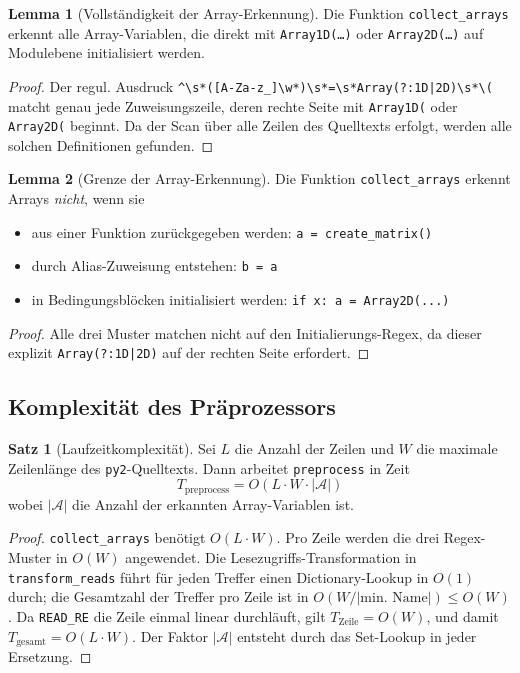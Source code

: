 ﻿\documentclass[a4paper,12pt]{article}
\theoremstyle{definition}
\newtheorem{satz}{Satz}
\newtheorem{lemma}{Lemma}
\begin{document}
\begin{lemma}[Vollst\"andigkeit der Array-Erkennung]
	Die Funktion \texttt{collect\_arrays} erkennt alle Array-Variablen, die direkt
	mit \texttt{Array1D(\ldots)} oder \texttt{Array2D(\ldots)} auf Modulebene
	initialisiert werden.
\end{lemma}

\begin{proof}
	Der regul. Ausdruck \texttt{\^{}\textbackslash{}s*([A-Za-z\_]\textbackslash{}w*)\textbackslash{}s*=\textbackslash{}s*Array(?:1D|2D)\textbackslash{}s*\textbackslash{}(}
	matcht genau jede Zuweisungszeile, deren rechte Seite mit \texttt{Array1D(} oder
	\texttt{Array2D(} beginnt. Da der Scan \"uber alle Zeilen des Quelltexts erfolgt,
	werden alle solchen Definitionen gefunden.
\end{proof}

\begin{lemma}[Grenze der Array-Erkennung]
	Die Funktion \texttt{collect\_arrays} erkennt Arrays \emph{nicht}, wenn sie
	\begin{itemize}
		\item aus einer Funktion zur\"uckgegeben werden: \texttt{a = create\_matrix()}
		\item durch Alias-Zuweisung entstehen: \texttt{b = a}
		\item in Bedingungsbl\"ocken initialisiert werden: \texttt{if x: a = Array2D(...)}
	\end{itemize}
\end{lemma}

\begin{proof}
	Alle drei Muster matchen nicht auf den Initialierungs-Regex, da dieser explizit
	\texttt{Array(?:1D|2D)} auf der rechten Seite erfordert.
\end{proof}

\subsection{Komplexit\"at des Pr\"aprozessors}

\begin{satz}[Laufzeitkomplexit\"at]
	Sei $L$ die Anzahl der Zeilen und $W$ die maximale Zeilenl\"ange des
	\texttt{py2}-Quelltexts. Dann arbeitet \texttt{preprocess} in Zeit
	\[
		T_{\text{preprocess}} = O(L \cdot W \cdot |\mathcal{A}|)
	\]
	wobei $|\mathcal{A}|$ die Anzahl der erkannten Array-Variablen ist.
\end{satz}

\begin{proof}
	\texttt{collect\_arrays} ben\"otigt $O(L \cdot W)$. Pro Zeile werden die drei
	Regex-Muster in $O(W)$ angewendet. Die Lesezugriffs-Transformation in
	\texttt{transform\_reads} f\"uhrt f\"ur jeden Treffer einen Dictionary-Lookup
	in $O(1)$ durch; die Gesamtzahl der Treffer pro Zeile ist in $O(W / |\text{min.~Name}|)
	\leq O(W)$. Da \texttt{READ\_RE} die Zeile einmal linear durchl\"auft, gilt
	$T_{\text{Zeile}} = O(W)$, und damit $T_{\text{gesamt}} = O(L \cdot W)$.
	Der Faktor $|\mathcal{A}|$ entsteht durch das Set-Lookup in jeder Ersetzung.
\end{proof}
\end{document}
